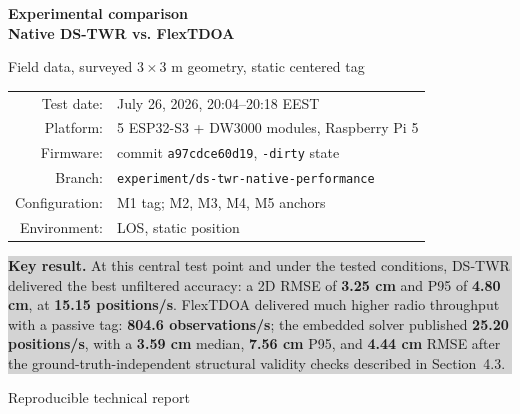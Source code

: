\documentclass[11pt,a4paper]{article}
\newcommand{\dstwr}{\textcolor{dsblue}{DS-TWR}}
\newcommand{\flextdoa}{\textcolor{flexorange}{FlexTDOA}}
\begin{document}

\begin{titlepage}
  \centering
  \vspace*{17mm}
  {\Huge\bfseries Experimental comparison\\[3mm]
  Native \dstwr{} vs. \flextdoa\par}
  \vspace{7mm}
  {\Large Field data, surveyed $3\times3$ m geometry, static centered tag\par}
  \vspace{18mm}

  \begin{tabular}{rl}
    Test date: & July 26, 2026, 20:04--20:18 EEST\\
    Platform: & 5 ESP32-S3 + DW3000 modules, Raspberry Pi 5\\
    Firmware: & commit \texttt{a97cdce60d19}, \texttt{-dirty} state\\
    Branch: & \texttt{experiment/ds-twr-native-performance}\\
    Configuration: & M1 tag; M2, M3, M4, M5 anchors\\
    Environment: & LOS, static position\\
  \end{tabular}

  \vfill
  \colorbox{lightgray}{%
    \begin{minipage}{0.88\textwidth}
      \vspace{3mm}
      \textbf{Key result.}
      At this central test point and under the tested conditions, DS-TWR
      delivered the best unfiltered accuracy: a 2D RMSE of
      \textbf{3.25 cm} and P95 of \textbf{4.80 cm}, at
      \textbf{15.15 positions/s}. FlexTDOA delivered much higher radio
      throughput with a passive tag: \textbf{804.6 observations/s}; the
      embedded solver published \textbf{25.20 positions/s}, with a
      \textbf{3.59 cm} median, \textbf{7.56 cm} P95, and
      \textbf{4.44 cm} RMSE after the ground-truth-independent structural
      validity checks described in Section~4.3.
      \vspace{3mm}
    \end{minipage}}
  \vfill
  {\large Reproducible technical report\par}
  \vspace{5mm}
\end{titlepage}

\tableofcontents
\clearpage
{}
\end{document}
